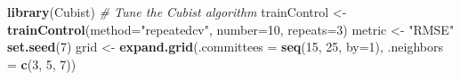 \documentclass[]{book}
\newenvironment{Shaded}{\begin{snugshade}}{\end{snugshade}}
\newcommand{\CommentTok}[1]{\textcolor[rgb]{0.56,0.35,0.01}{\textit{#1}}}
\newcommand{\DataTypeTok}[1]{\textcolor[rgb]{0.13,0.29,0.53}{#1}}
\newcommand{\DecValTok}[1]{\textcolor[rgb]{0.00,0.00,0.81}{#1}}
\newcommand{\KeywordTok}[1]{\textcolor[rgb]{0.13,0.29,0.53}{\textbf{#1}}}
\newcommand{\NormalTok}[1]{#1}
\newcommand{\StringTok}[1]{\textcolor[rgb]{0.31,0.60,0.02}{#1}}
\begin{document}
\begin{Shaded}
\begin{Highlighting}[]
\KeywordTok{library}\NormalTok{(Cubist)}
\CommentTok{# Tune the Cubist algorithm}
\NormalTok{trainControl <-}\StringTok{ }\KeywordTok{trainControl}\NormalTok{(}\DataTypeTok{method=}\StringTok{"repeatedcv"}\NormalTok{, }\DataTypeTok{number=}\DecValTok{10}\NormalTok{, }\DataTypeTok{repeats=}\DecValTok{3}\NormalTok{)}
\NormalTok{metric <-}\StringTok{ "RMSE"}
\KeywordTok{set.seed}\NormalTok{(}\DecValTok{7}\NormalTok{)}
\NormalTok{grid <-}\StringTok{ }\KeywordTok{expand.grid}\NormalTok{(}\DataTypeTok{.committees =} \KeywordTok{seq}\NormalTok{(}\DecValTok{15}\NormalTok{, }\DecValTok{25}\NormalTok{, }\DataTypeTok{by=}\DecValTok{1}\NormalTok{), }
                    \DataTypeTok{.neighbors =} \KeywordTok{c}\NormalTok{(}\DecValTok{3}\NormalTok{, }\DecValTok{5}\NormalTok{, }\DecValTok{7}\NormalTok{))}


\end{Highlighting}
\end{Shaded}
\end{document}
